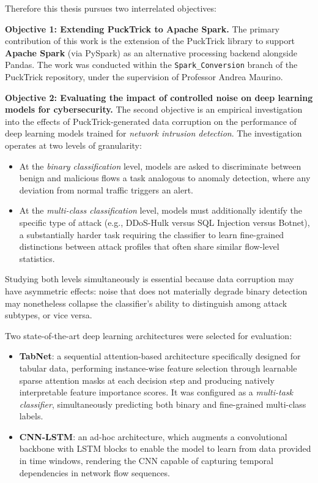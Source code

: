 \documentclass{article}
\begin{document}
Therefore this thesis pursues two interrelated objectives:

\textbf{Objective 1: Extending PuckTrick to Apache Spark.} The primary contribution of this work is the extension of the PuckTrick
library to support \textbf{Apache Spark} (via PySpark) as an alternative
processing backend alongside Pandas. The work was conducted within the
\texttt{Spark\_Conversion} branch of the PuckTrick repository, 
under the supervision of Professor Andrea Maurino.

\textbf{Objective 2: Evaluating the impact of controlled noise on deep
learning models for cybersecurity.} The second objective is an empirical
investigation into the effects of PuckTrick-generated data corruption on
the performance of deep learning models trained for \emph{network
intrusion detection}. The investigation operates at two levels of
granularity:

\begin{itemize}
\item
  At the \emph{binary classification} level, models are asked to
  discriminate between benign and malicious flows a task analogous
  to anomaly detection, where any deviation from normal traffic triggers
  an alert.
\item
  At the \emph{multi-class classification} level, models must
  additionally identify the specific type of attack (e.g., DDoS-Hulk
  versus SQL Injection versus Botnet), a substantially harder task
  requiring the classifier to learn fine-grained distinctions between
  attack profiles that often share similar flow-level statistics.
\end{itemize}

Studying both levels simultaneously is essential because data corruption
may have asymmetric effects: noise that does not materially degrade
binary detection may nonetheless collapse the classifier's ability to
distinguish among attack subtypes, or vice versa.

Two state-of-the-art deep learning architectures were selected for
evaluation:

\begin{itemize}
\item
  \textbf{TabNet}: a sequential attention-based architecture
  specifically designed for tabular data, performing instance-wise
  feature selection through learnable sparse attention masks at each
  decision step and producing natively interpretable feature importance
  scores. It was configured as a \emph{multi-task classifier},
  simultaneously predicting both binary and fine-grained multi-class
  labels.
\item
  \textbf{CNN-LSTM}: an ad-hoc architecture, which augments a convolutional
  backbone with LSTM blocks to enable the model to learn from data
  provided in time windows, rendering the CNN capable of capturing
  temporal dependencies in network flow sequences.
\end{itemize}
\end{document}
